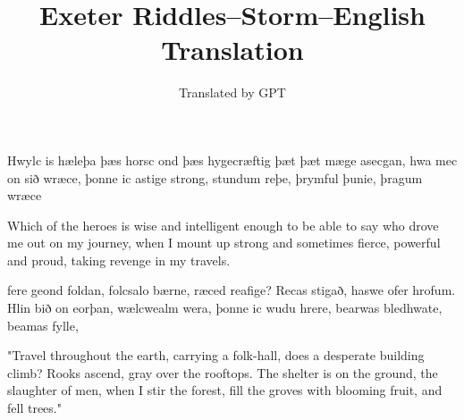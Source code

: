 \documentclass[12pt]{book}
\begin{document}
\title{Exeter Riddles--Storm--English Translation}
\date{}
\author{Translated by GPT}

\maketitle\begin{pairs}
\begin{Rightside}
\begin{Old English}
\beginnumbering
\pstart
Hwylc is hæleþa þæs horsc      ond þæs hygecræftig
þæt þæt mæge asecgan,      hwa mec on sið wræce,
þonne ic astige strong,      stundum reþe,
þrymful þunie,      þragum wræce

\pend
\endnumbering
\end{Old English}
\end{Rightside}
\begin{Leftside}
\begin{English}
\beginnumbering
\pstart
Which of the heroes is wise and intelligent enough
to be able to say who drove me out on my journey,
when I mount up strong and sometimes fierce,
powerful and proud, taking revenge in my travels.
\pend
\endnumbering
\end{English}
\end{Leftside}
\end{pairs}
\Columns
\begin{pairs}
\begin{Rightside}
\begin{Old English}
\beginnumbering
\pstart
fere geond foldan,      folcsalo bærne,
ræced reafige?      Recas stigað,
haswe ofer hrofum.      Hlin bið on eorþan,
wælcwealm wera,      þonne ic wudu hrere,
bearwas bledhwate,      beamas fylle,

\pend
\endnumbering
\end{Old English}
\end{Rightside}
\begin{Leftside}
\begin{English}
\beginnumbering
\pstart
"Travel throughout the earth, carrying a folk-hall, does a desperate building climb? Rooks ascend, gray over the rooftops. The shelter is on the ground, the slaughter of men, when I stir the forest, fill the groves with blooming fruit, and fell trees."
\pend
\endnumbering
\end{English}
\end{Leftside}
\end{pairs}
\Columns
\end{document}
